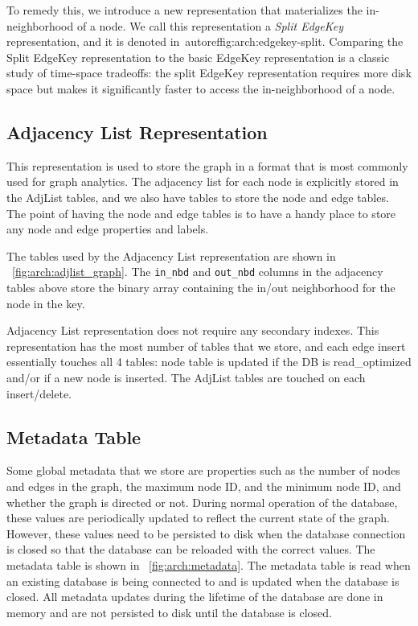 To remedy this, we introduce a new representation that materializes the in-neighborhood of a node.
We call this representation a \emph{Split EdgeKey} representation, and it is denoted in~autoref{fig:arch:edgekey-split}.
Comparing the Split EdgeKey representation to the basic EdgeKey representation is a classic study of time-space tradeoffs: the split EdgeKey representation requires more disk space but makes it significantly faster to access the in-neighborhood of a node.

\subsection{Adjacency List Representation}
\label{arch:adjlist}
This representation is used to store the graph in a format that is most commonly used for graph analytics.
The adjacency list for each node is explicitly stored in the AdjList tables, and we also have tables to store the node and edge tables.
The point of having the node and edge tables is to have a handy place to store any node and edge properties and labels. 

The tables used by the Adjacency List representation are shown in ~\autoref{fig:arch:adjlist_graph}.
The \texttt{in\_nbd} and \texttt{out\_nbd} columns in the adjacency tables above store the binary array containing the in/out neighborhood for the node in the key.

Adjacency List representation does not require any secondary indexes. 
This representation has the most number of tables that we store, and each edge insert essentially touches all 4 tables: node table is updated if the DB is read\_optimized and/or if a new node is inserted. 
The AdjList tables are touched on each insert/delete.

\subsection{Metadata Table}
Some global metadata that we store are properties such as the number of nodes and edges in the graph, the maximum node ID, and the minimum node ID, and whether the graph is directed or not.
During normal operation of the database, these values are periodically updated to reflect the current state of the graph.
However, these values need to be persisted to disk when the database connection is closed so that the database can be reloaded with the correct values.
The metadata table is shown in ~\autoref{fig:arch:metadata}.
The metadata table is read when an existing database is being connected to and is updated when the database is closed.
All metadata updates during the lifetime of the database are done in memory and are not persisted to disk until the database is closed.

